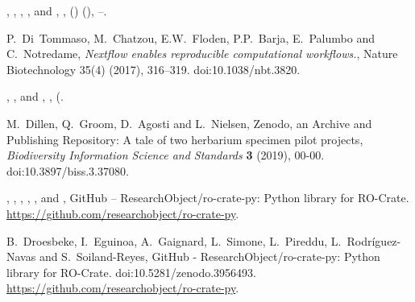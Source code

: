 \documentclass[ds,v1.1.2,openaccess]{iosart2x}%
\begin{document}
\begin{thebibliography}{}
%
\begin{barticle}
,
,
,
,
 and
,
,
()
(),
--.
\end{barticle}
%
\OrigBibText
P.~Di~Tommaso,
M.~Chatzou,
E.W.~Floden,
P.P.~Barja,
E.~Palumbo and
C.~Notredame,
\textit{Nextflow enables reproducible computational workflows.},
Nature Biotechnology
35(4)
(2017),
316--319.
doi:10.1038/nbt.3820.
\endOrigBibText
{}
\endbibitem

%
\begin{barticle}
,
,
 and
,
,
(.
\end{barticle}
%
\OrigBibText
M.~Dillen,
Q.~Groom,
D.~Agosti and
L.~Nielsen,
Zenodo, an Archive and Publishing Repository: A tale of two herbarium specimen
pilot projects,
\textit{Biodiversity Information Science and Standards}
\textbf{3}
(2019), 00-00.
doi:10.3897/biss.3.37080.
\endOrigBibText
{}
\endbibitem

%
\begin{botherref}
,
,
,
,
,
 and
,
{GitHub} -- {ResearchObject}/ro-crate-py: Python library for {RO}-Crate.
\url{https://github.com/researchobject/ro-crate-py}.
\end{botherref}
%
\OrigBibText
B.~Droesbeke,
I.~Eguinoa,
A.~Gaignard,
L.~Simone,
L.~Pireddu,
L.~Rodr\'iguez-Navas and
S.~Soiland-Reyes,
{GitHub} - {ResearchObject}/ro-crate-py: Python library for {RO}-Crate.
doi:10.5281/zenodo.3956493.
\url{https://github.com/researchobject/ro-crate-py}.
\endOrigBibText
{}
\endbibitem


\end{thebibliography}
\end{document}
